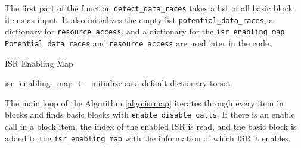 \documentclass[
fancyheadings, %
%
%
]{stsreprt}
\begin{document}
{The first part of the function \texttt{detect\_data\_races} takes a list of all basic block items as input. It also initializes the empty list \texttt{potential\_data\_races}, a dictionary for \texttt{resource\_access}, and a dictionary for the \texttt{isr\_enabling\_map}. \texttt{Potential\_data\_races} and \texttt{resource\_access} are used later in the code.

\begin{algorithm}[H]
	\caption{ISR Enabling Map}
	\label{algo:isrmap}
	\DontPrintSemicolon
	\SetAlgoLined
	\BlankLine
	isr\_enabling\_map $\gets$ initialize as a default dictionary to set\;
	\BlankLine
\end{algorithm}

\vspace{1cm}
The main loop of the Algorithm \ref{algo:isrmap} iterates through every item in blocks and finds basic blocks with \texttt{enable\_disable\_calls}. If there is an enable call in a block item, the index of the enabled \ac{ISR} is read, and the basic block is added to the \texttt{isr\_enabling\_map} with the information of which \ac{ISR} it enables.

}
\end{document}
